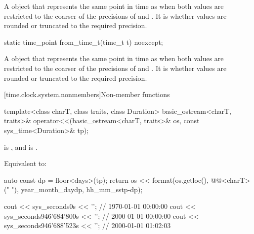\begin{itemdescr}
\pnum
\returns
A  object that represents the same point in time as 
when both values are restricted to the coarser of the precisions of  and
.
It is 
whether values are rounded or truncated to the required precision.
\end{itemdescr}

%
\begin{itemdecl}
static time_point from_time_t(time_t t) noexcept;
\end{itemdecl}

\begin{itemdescr}
\pnum
\returns
A  object that represents the same point in time as 
when both values are restricted to the coarser of the precisions of  and
.
It is 
whether values are rounded or truncated to the required precision.
\end{itemdescr}

[time.clock.system.nonmembers]{Non-member functions}

%
\begin{itemdecl}
template<class charT, class traits, class Duration>
  basic_ostream<charT, traits>&
    operator<<(basic_ostream<charT, traits>& os, const sys_time<Duration>& tp);
\end{itemdecl}

\begin{itemdescr}
\pnum
\constraints
{} is , and
 is .

\pnum
\effects
Equivalent to:
\begin{codeblock}
auto const dp = floor<days>(tp);
return os << format(os.getloc(), @@<charT>("{} {}"),
                    year_month_day{dp}, hh_mm_ss{tp-dp});
\end{codeblock}

\pnum
\begin{example}
\begin{codeblock}
cout << sys_seconds{0s} << '\n';                // 1970-01-01 00:00:00
cout << sys_seconds{946'684'800s} << '\n';      // 2000-01-01 00:00:00
cout << sys_seconds{946'688'523s} << '\n';      // 2000-01-01 01:02:03
\end{codeblock}
\end{example}
\end{itemdescr}

